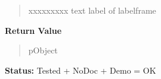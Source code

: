 \begin{boxedminipage}{\funcwidth}
\begin{quote}
\begin{Ventry}{xxxxxxxxx}
          text label of labelframe

        \end{Ventry}

      \end{quote}

      \textbf{Return Value}
    \vspace{-1ex}

      \begin{quote}
      pObject

      \end{quote}

\textbf{Status:} Tested + NoDoc + Demo = OK



    \end{boxedminipage}

    \label{xformslib:library:fl_add_free}

    \vspace{0.5ex}

